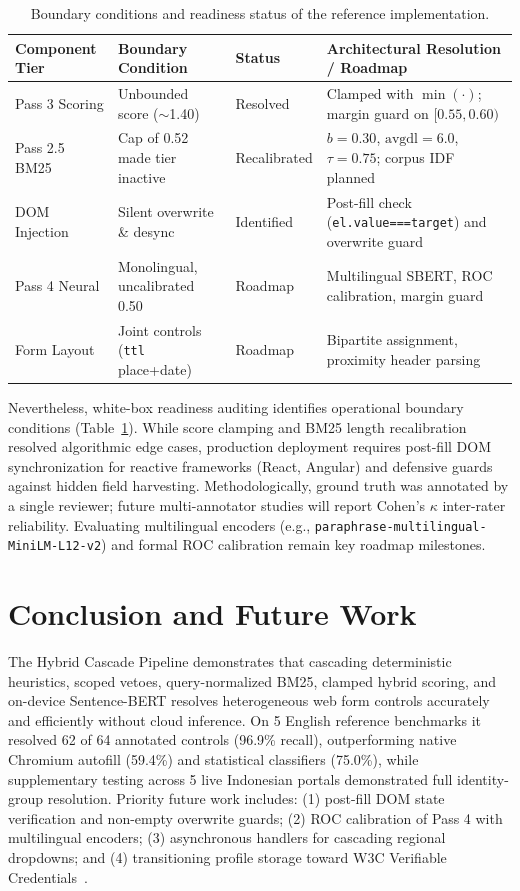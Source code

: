 \documentclass[11pt,runningheads,a4paper]{llncs}
\begin{document}
\begin{table}[t]
\caption{Boundary conditions and readiness status of the reference implementation.}
\label{tab:audit}
\centering
\scriptsize
\setlength{\tabcolsep}{3pt}
\renewcommand{\arraystretch}{0.90}
\begin{tabular}{p{2.0cm}p{2.8cm}p{1.4cm}p{5.1cm}}
\toprule
\textbf{Component Tier} & \textbf{Boundary Condition} & \textbf{Status} & \textbf{Architectural Resolution / Roadmap} \\
\midrule
Pass 3 Scoring & Unbounded score ($\sim$1.40) & Resolved & Clamped with $\min(\cdot)$; margin guard on $[0.55,0.60)$ \\
Pass 2.5 BM25 & Cap of 0.52 made tier inactive & Recalibrated & $b{=}0.30$, $\text{avgdl}{=}6.0$, $\tau{=}0.75$; corpus IDF planned \\
DOM Injection & Silent overwrite \& desync & Identified & Post-fill check (\texttt{el.value===target}) and overwrite guard \\
Pass 4 Neural & Monolingual, uncalibrated 0.50 & Roadmap & Multilingual SBERT, ROC calibration, margin guard \\
Form Layout & Joint controls (\texttt{ttl} place+date) & Roadmap & Bipartite assignment, proximity header parsing \\
\bottomrule
\end{tabular}
\end{table}

Nevertheless, white-box readiness auditing identifies operational boundary conditions (Table~\ref{tab:audit}). While score clamping and BM25 length recalibration resolved algorithmic edge cases, production deployment requires post-fill DOM synchronization for reactive frameworks (React, Angular) and defensive guards against hidden field harvesting. Methodologically, ground truth was annotated by a single reviewer; future multi-annotator studies will report Cohen's $\kappa$ inter-rater reliability. Evaluating multilingual encoders (e.g., \texttt{paraphrase-multilingual-MiniLM-L12-v2}) and formal ROC calibration remain key roadmap milestones.

\section{Conclusion and Future Work}
The Hybrid Cascade Pipeline demonstrates that cascading deterministic heuristics, scoped vetoes, query-normalized BM25, clamped hybrid scoring, and on-device Sentence-BERT resolves heterogeneous web form controls accurately and efficiently without cloud inference. On 5 English reference benchmarks it resolved 62 of 64 annotated controls (96.9\% recall), outperforming native Chromium autofill (59.4\%) and statistical classifiers (75.0\%), while supplementary testing across 5 live Indonesian portals demonstrated full identity-group resolution. Priority future work includes: (1) post-fill DOM state verification and non-empty overwrite guards; (2) ROC calibration of Pass 4 with multilingual encoders; (3) asynchronous handlers for cascading regional dropdowns; and (4) transitioning profile storage toward W3C Verifiable Credentials~\cite{vc}.
\end{document}
